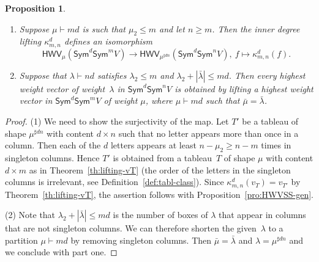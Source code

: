 \documentclass[11pt]{amsart}
\def\Sym{\mathsf{Sym}}
\def\la{\lambda}
\newcommand{\out}{d}
\newcommand{\imm}{m}
\newcommand{\HWV}{\mathsf{HWV}}
\numberwithin{equation}{section}
\newtheorem{proposition}[theorem]{Proposition}
\begin{document}
\begin{proposition}\label{pro:lifting}
\begin{enumerate}
\item Suppose $\mu\vdash md$ is such that $\mu_2 \le m$ and let $n\ge m$. 
Then the inner degree lifting $\kappa^d_{m,n}$ %
defines an isomorphism
\begin{equation*}\label{eq:InnerLift}
\HWV_{\mu}(\Sym^\out \Sym^\imm V) \to \HWV_{\mu^{\sharp dn}}(\Sym^\out \Sym^{n} V) ,\ 
 f\mapsto \kappa^d_{m,n}(f) .
\end{equation*}

\item Suppose that $\la\vdash nd$ satisfies $\la_2\le m$ and $\la_2 + |\bar{\la}| \le md$. 
Then every highest weight vector of weight~$\la$ in 
$\Sym^d\Sym^n V$  is obtained by lifting a highest weight vector in $\Sym^d\Sym^{m} V$ 
of weight $\mu$, where $\mu\vdash md$ such that $\bar{\mu} = \bar{\la}$.
\end{enumerate}
\end{proposition}

\begin{proof}
(1) We need to show the surjectivity of the map. 
Let $T'$ be a tableau of shape $\mu^{\sharp dn}$ with content $d\times n$
such that no letter appears more than once in a column. 
Then each of the $d$ letters appears at least 
$n-\mu_2\ge n-m$ times in singleton columns. 
Hence 
$T'$ is obtained from a tableau~$T$ of shape $\mu$ with content $d\times m$ 
as in Theorem~\ref{th:lifting-vT} (the order of the letters in the singleton columns is irrelevant, 
see Definition~\ref{def:tabl-class}). 
Since $\kappa^d_{m,n}(v_T) = v_{T'}$ by Theorem~\ref{th:lifting-vT},
the assertion follows with Proposition~\ref{pro:HWVSS-gen}.

(2) Note that $\la_2 + |\bar{\la}| \le md$ is the number of boxes of $\la$ that appear in columns 
that are not singleton columns. We can therefore shorten the given~$\la$ to a partition 
$\mu\vdash md$ by removing singleton columns. 
Then $\bar{\mu}= \bar{\la}$ and 
$\la = \mu^{\sharp dn}$ and we conclude with part one. 
\end{proof}



\end{document}
